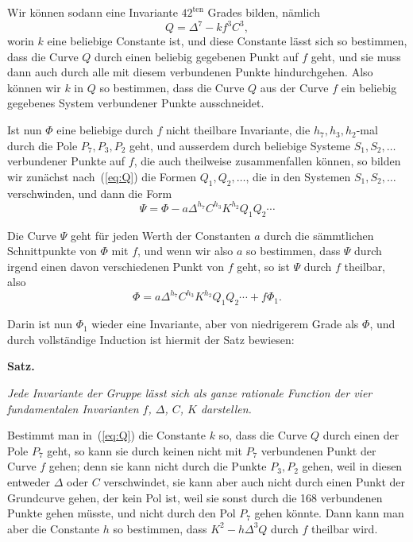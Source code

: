 \documentclass[12pt,a4paper]{article}
\begin{document}
Wir k\"onnen sodann eine Invariante $42^{\text{ten}}$ Grades bilden, n\"amlich
\begin{equation}
\label{eq:Q} Q = \Delta^7 - kf^3 C^3,
\end{equation}
worin $k$ eine beliebige Constante ist, und diese Constante l\"asst sich so bestimmen, dass die Curve $Q$ durch einen beliebig gegebenen Punkt auf $f$ geht, und sie muss dann auch durch alle mit diesem verbundenen Punkte hindurchgehen. Also k\"onnen wir $k$ in $Q$ so bestimmen, dass die Curve $Q$ aus der Curve $f$ ein beliebig gegebenes System verbundener Punkte ausschneidet.

Ist nun $\Phi$ eine beliebige durch $f$ nicht theilbare Invariante, die $h_7, h_3, h_2$-mal durch die Pole $P_7, P_3, P_2$ geht, und ausserdem durch beliebige Systeme $S_1, S_2, \ldots$ verbundener Punkte auf $f$, die auch theilweise zusammenfallen k\"onnen, so bilden wir zun\"achst nach~(\ref{eq:Q}) die Formen $Q_1, Q_2, \ldots$, die in den Systemen $S_1, S_2, \ldots$ verschwinden, und dann die Form
\[\Psi = \Phi - a\Delta^{h_7} C^{h_3} K^{h_2} Q_1 Q_2 \cdots\]

Die Curve $\Psi$ geht f\"ur jeden Werth der Constanten $a$ durch die s\"ammtlichen Schnittpunkte von $\Phi$ mit $f$, und wenn wir also $a$ so bestimmen, dass $\Psi$ durch irgend einen davon verschiedenen Punkt von $f$ geht, so ist $\Psi$ durch $f$ theilbar, also
\[\Phi = a\Delta^{h_7} C^{h_3} K^{h_2} Q_1 Q_2 \cdots + f\Phi_1.\]

Darin ist nun $\Phi_1$ wieder eine Invariante, aber von niedrigerem Grade als $\Phi$, und durch vollst\"andige Induction ist hiermit der Satz bewiesen:

\begin{center}\textbf{Satz.}\end{center}
\textit{Jede Invariante der Gruppe l\"asst sich als ganze rationale Function der vier fundamentalen Invarianten $f$, $\Delta$, $C$, $K$ darstellen.}

Bestimmt man in~(\ref{eq:Q}) die Constante $k$ so, dass die Curve $Q$ durch einen der Pole $P_7$ geht, so kann sie durch keinen nicht mit $P_7$ verbundenen Punkt der Curve $f$ gehen; denn sie kann nicht durch die Punkte $P_3, P_2$ gehen, weil in diesen entweder $\Delta$ oder $C$ verschwindet, sie kann aber auch nicht durch einen Punkt der Grundcurve gehen, der kein Pol ist, weil sie sonst durch die 168 verbundenen Punkte gehen m\"usste, und nicht durch den Pol $P_7$ gehen k\"onnte. Dann kann man aber die Constante $h$ so bestimmen, dass $K^2 - h\Delta^3 Q$ durch $f$ theilbar wird.
\end{document}
